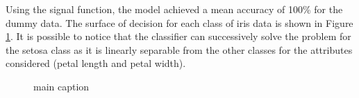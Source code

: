 \documentclass[12pt,a4paper]{article}
\begin{document}
Using the signal function, the model achieved a mean accuracy of 100\% for the dummy data. The surface of decision for each class of iris data is shown in Figure \ref{fig:iris-decision-surface}. It is possible to notice that the classifier can successively solve the problem for the setosa class as it is linearly separable from the other classes for the attributes considered (petal length and petal width).

\begin{figure}[tp]
    \centering
    

    
    \caption{main caption}
    \label{fig:iris-decision-surface}
    
    \end{figure}
\end{document}
